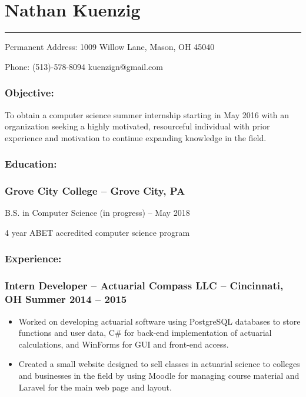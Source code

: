 \documentclass[12pt]{article}
\theoremstyle{plain} %
\theoremstyle{definition} %
\begin{document}
{
	\centering\section*{\color{head}Nathan Kuenzig}
	\vspace{-7mm}
	\noindent\color{head2}\rule{\textwidth}{1pt}
	
	{\footnotesize {\color{accent}Permanent Address:} 1009 Willow Lane, Mason, OH 45040
	
	{\color{accent}Phone:} (513)-578-8094  kuenzign@gmail.com}

}


\subsubsection*{\color{head}Objective:}
\small To obtain a computer science summer internship starting in May 2016 with an organization seeking a highly motivated, resourceful individual with prior experience and motivation to continue expanding knowledge in the field.

\subsubsection*{\color{head}Education:}
\subsubsection*{\textnormal{{\color{accent} Grove City College }\color{head} -- Grove City, PA}}

\noindent\hspace{2.25pc} B.S. in Computer Science (in progress) -- May 2018

\noindent\hspace{2.25pc} 4 year ABET accredited computer science program

\subsubsection*{\color{head}Experience:}
\subsubsection*{\textnormal{{\color{accent} Intern Developer }\color{head} -- Actuarial Compass LLC -- Cincinnati, OH	\hfill Summer 2014 -- 2015}}
\begin{itemize}
	\item Worked on developing actuarial software using PostgreSQL databases to store functions and user data, C\# for back-end implementation of actuarial calculations, and WinForms for GUI and front-end access.
	\item Created a small website designed to sell classes in actuarial science to colleges and businesses in the field by using Moodle for managing course material and Laravel for the main web page and layout.
\end{itemize}
\end{document}
